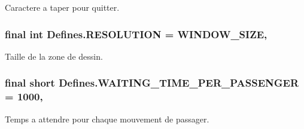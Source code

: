 Caractere a taper pour quitter. 

\hypertarget{classDefines_acd16804e8dcad6ce6fe8ad2e1b3f99e0}{
\subsubsection[{R\-E\-S\-O\-L\-U\-T\-I\-O\-N}]{\setlength{\rightskip}{0pt plus 5cm}final int Defines.\-R\-E\-S\-O\-L\-U\-T\-I\-O\-N = {\bf W\-I\-N\-D\-O\-W\-\_\-\-S\-I\-Z\-E}\hspace{0.3cm}{\ttfamily [static]}, {\ttfamily [package]}}}\label{classDefines_acd16804e8dcad6ce6fe8ad2e1b3f99e0}


Taille de la zone de dessin. 

\hypertarget{classDefines_aece514c1581f2329ad852547b512827c}{
\subsubsection[{W\-A\-I\-T\-I\-N\-G\-\_\-\-T\-I\-M\-E\-\_\-\-P\-E\-R\-\_\-\-P\-A\-S\-S\-E\-N\-G\-E\-R}]{\setlength{\rightskip}{0pt plus 5cm}final short Defines.\-W\-A\-I\-T\-I\-N\-G\-\_\-\-T\-I\-M\-E\-\_\-\-P\-E\-R\-\_\-\-P\-A\-S\-S\-E\-N\-G\-E\-R = 1000\hspace{0.3cm}{\ttfamily [static]}, {\ttfamily [package]}}}\label{classDefines_aece514c1581f2329ad852547b512827c}


Temps a attendre pour chaque mouvement de passager. 

